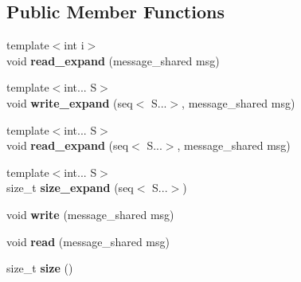 \subsection*{\-Public \-Member \-Functions}
\begin{DoxyCompactItemize}
\item 
\hypertarget{classgal_1_1network_1_1serial__ext_a3351ca1d29f0996e8e0d53f297bd6d2a}{{\footnotesize template$<$int i$>$ }\\void {\bfseries read\-\_\-expand} (message\-\_\-shared msg)}\label{classgal_1_1network_1_1serial__ext_a3351ca1d29f0996e8e0d53f297bd6d2a}

\item 
\hypertarget{classgal_1_1network_1_1serial__ext_a809b3aaf3e7b230917ecdba03478394f}{{\footnotesize template$<$int... \-S$>$ }\\void {\bfseries write\-\_\-expand} (seq$<$ \-S...$>$, message\-\_\-shared msg)}\label{classgal_1_1network_1_1serial__ext_a809b3aaf3e7b230917ecdba03478394f}

\item 
\hypertarget{classgal_1_1network_1_1serial__ext_a4390bf410c73d1248d570711a7c7b23f}{{\footnotesize template$<$int... \-S$>$ }\\void {\bfseries read\-\_\-expand} (seq$<$ \-S...$>$, message\-\_\-shared msg)}\label{classgal_1_1network_1_1serial__ext_a4390bf410c73d1248d570711a7c7b23f}

\item 
\hypertarget{classgal_1_1network_1_1serial__ext_a28603c0e7dbdb1d1e766ed922889886e}{{\footnotesize template$<$int... \-S$>$ }\\size\-\_\-t {\bfseries size\-\_\-expand} (seq$<$ \-S...$>$)}\label{classgal_1_1network_1_1serial__ext_a28603c0e7dbdb1d1e766ed922889886e}

\item 
\hypertarget{classgal_1_1network_1_1serial__ext_a492710a00e65fa43ded36916dbf1ea28}{void {\bfseries write} (message\-\_\-shared msg)}\label{classgal_1_1network_1_1serial__ext_a492710a00e65fa43ded36916dbf1ea28}

\item 
\hypertarget{classgal_1_1network_1_1serial__ext_a06038a5f1aadd0fe73e966ceeacbc685}{void {\bfseries read} (message\-\_\-shared msg)}\label{classgal_1_1network_1_1serial__ext_a06038a5f1aadd0fe73e966ceeacbc685}

\item 
\hypertarget{classgal_1_1network_1_1serial__ext_a78848aa7718b88c624070e01e583bdec}{size\-\_\-t {\bfseries size} ()}\label{classgal_1_1network_1_1serial__ext_a78848aa7718b88c624070e01e583bdec}

\end{DoxyCompactItemize}
